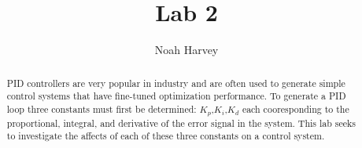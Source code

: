 \documentclass[a4paper,titlepage]{article}
\begin{document}
\title{Lab 2}
\author{Noah Harvey}
\maketitle

\begin{abstract}
	PID controllers are very popular in industry and are often used to generate
	simple control systems that have fine-tuned optimization performance. To
	generate a PID loop three constants must first be determined:
	$K_p$,$K_i$,$K_d$ each cooresponding to the proportional, integral, and
	derivative of the error signal in the system. This lab seeks to investigate
	the affects of each of these three constants on a control system.
\end{abstract}

\tableofcontents
\listoftables
\listoffigures

\pagebreak





\pagebreak

\end{document}
